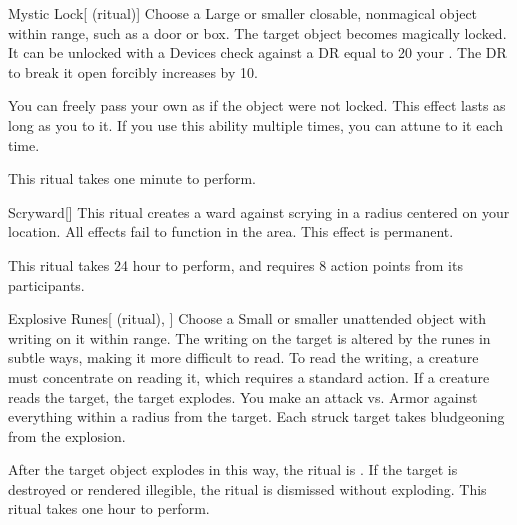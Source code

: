 \lowercase{\hypertarget{spell:Mystic Lock}{}}\label{spell:Mystic Lock}
\begin{attuneability}[\nth{2}]{\hypertarget{spell:Mystic Lock}{Mystic Lock}}[ (ritual)]
Choose a Large or smaller closable, nonmagical object within \rngclose range, such as a door or box.
The target object becomes magically locked.
It can be unlocked with a Devices check against a DR equal to 20 \add your .
The DR to break it open forcibly increases by 10.

You can freely pass your own  as if the object were not locked.
This effect lasts as long as you  to it.
If you use this ability multiple times, you can attune to it each time.

This ritual takes one minute to perform.
\end{attuneability}
\vspace{0.25em}



\lowercase{\hypertarget{spell:Scryward}{}}\label{spell:Scryward}
\begin{freeability}[\nth{2}]{\hypertarget{spell:Scryward}{Scryward}}[]
This ritual creates a ward against scrying in a \arealarge radius  centered on your location.
All  effects fail to function in the area.
This effect is permanent.

This ritual takes 24 hour to perform, and requires 8 action points from its participants.
\end{freeability}
\vspace{0.25em}



\lowercase{\hypertarget{spell:Explosive Runes}{}}\label{spell:Explosive Runes}
\begin{attuneability}[\nth{3}]{\hypertarget{spell:Explosive Runes}{Explosive Runes}}[ (ritual), ]
Choose a Small or smaller unattended object with writing on it within \rngclose range.
The writing on the target is altered by the runes in subtle ways, making it more difficult to read.
To read the writing, a creature must concentrate on reading it, which requires a standard action.
If a creature reads the target, the target explodes.
You make an attack vs. Armor against everything within a \areamed radius from the target.
Each struck target takes bludgeoning  from the explosion.

After the target object explodes in this way, the ritual is .
If the target is destroyed or rendered illegible, the ritual is dismissed without exploding.
This ritual takes one hour to perform.
\end{attuneability}
\vspace{0.25em}



